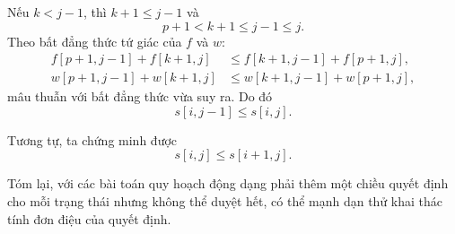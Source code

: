\documentclass[11pt]{article}
\begin{document}
Nếu $k<j-1$, thì $k+1\le j-1$ và
\[
  p+1<k+1\le j-1\le j.
\]
Theo bất đẳng thức tứ giác của $f$ và $w$:
\[
\begin{aligned}
  f[p+1,j-1]+f[k+1,j]
  &\le f[k+1,j-1]+f[p+1,j],\\
  w[p+1,j-1]+w[k+1,j]
  &\le w[k+1,j-1]+w[p+1,j],
\end{aligned}
\]
mâu thuẫn với bất đẳng thức vừa suy ra. Do đó
\[
  s[i,j-1]\le s[i,j].
\]

Tương tự, ta chứng minh được
\[
  s[i,j]\le s[i+1,j].
\]

Tóm lại, với các bài toán quy hoạch động dạng phải thêm một chiều quyết định
cho mỗi trạng thái nhưng không thể duyệt hết, có thể mạnh dạn thử khai thác
tính đơn điệu của quyết định.
\end{document}
